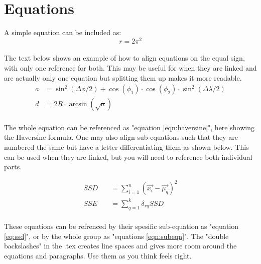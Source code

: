 
\section{Equations}

A simple equation can be included as: \\

\begin{equation}
        r = 2\pi^{2}
        \label{eqn:simple_eqn}
\end{equation} \\


\noindent The text below shows an example of how to align equations on the equal sign, with only one reference for both. This may be useful for when they are linked and are actually only one equation but splitting them up makes it more readable. \\

\begin{equation}
\begin{aligned}
        a &= \sin^{2}(\Delta\phi/2) + \cos(\phi_{1})\cdot\cos(\phi_{2})\cdot\sin^{2}(\Delta\lambda/2)\\
        d &= 2R\cdot\arcsin(\sqrt{a})
\end{aligned}
\label{eqn:haversine}
\end{equation} \\

\noindent The whole equation can be referenced as "equation \eqref{eqn:haversine}", here showing the Haversine formula. One may also align sub-equations such that they are numbered the same but have a letter differentiating them as shown below. This can be used when they are linked, but you will need to reference both individual parts.

\begin{subequations}
\begin{align}
    SSD 
        & \quad = \sum_{i=1}^{n} (\vec{x_{i}}-\vec{\mu_{q}})^{2} \label{eq:ssd}\\[15pt] %
    SSE 
        & \quad = \sum_{q=1}^{k} \delta_{rq} SSD \label{eq:sse}
\end{align}
\label{eqn:subeqn}
\end{subequations} \\

\noindent These equations can be refrenced by their spesific sub-equation as "equation \eqref{eq:ssd}", or by the whole group as "equations \eqref{eqn:subeqn}". The "double backslashes" in the .tex creates line spaces and gives more room around the equations and paragraphs. Use them as you think feels right. 



